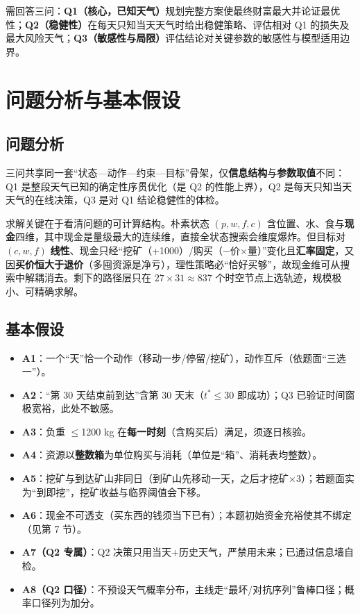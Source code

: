 \documentclass[12pt,a4paper]{ctexart}
\begin{document}
需回答三问：\textbf{Q1（核心，已知天气）}规划完整方案使最终财富最大并论证最优性；\textbf{Q2（稳健性）}在每天只知当天天气时给出稳健策略、评估相对 Q1 的损失及最大风险天气；\textbf{Q3（敏感性与局限）}评估结论对关键参数的敏感性与模型适用边界。

\section{问题分析与基本假设}

\subsection{问题分析}

三问共享同一套“状态—动作—约束—目标”骨架，仅\textbf{信息结构}与\textbf{参数取值}不同：Q1 是整段天气已知的确定性序贯优化（是 Q2 的性能上界），Q2 是每天只知当天天气的在线决策，Q3 是对 Q1 结论稳健性的体检。

求解关键在于看清问题的可计算结构。朴素状态 $(p,w,f,c)$ 含位置、水、食与\textbf{现金}四维，其中现金是量级最大的连续维，直接全状态搜索会维度爆炸。但目标对 $(c,w,f)$ \textbf{线性}、现金只经“挖矿（+1000）/购买（$-$价$\times$量）”变化且\textbf{汇率固定}，又因\textbf{买价恒大于退价}（多囤资源是净亏），理性策略必“恰好买够”，故现金维可从搜索中解耦消去。剩下的路径层只在 $27\times31\approx 837$ 个时空节点上选轨迹，规模极小、可精确求解。

\subsection{基本假设}

\begin{itemize}
  \item \textbf{A1}：一个“天”恰一个动作（移动一步/停留/挖矿），动作互斥（依题面“三选一”）。
  \item \textbf{A2}：“第 30 天结束前到达”含第 30 天末（$t^*\le 30$ 即成功）；Q3 已验证时间窗极宽裕，此处不敏感。
  \item \textbf{A3}：负重 $\le$1200 kg 在\textbf{每一时刻}（含购买后）满足，须逐日核验。
  \item \textbf{A4}：资源以\textbf{整数箱}为单位购买与消耗（单位是“箱”、消耗表均整数）。
  \item \textbf{A5}：挖矿与到达矿山非同日（到矿山先移动一天，之后才挖矿$\times$3）；若题面实为“到即挖”，挖矿收益与临界阈值会下移。
  \item \textbf{A6}：现金不可透支（买东西的钱须当下已有）；本题初始资金充裕使其不绑定（见第 7 节）。
  \item \textbf{A7（Q2 专属）}：Q2 决策只用当天+历史天气，严禁用未来；已通过信息墙自检。
  \item \textbf{A8（Q2 口径）}：不预设天气概率分布，主线走“最坏/对抗序列”鲁棒口径；概率口径列为加分。
\end{itemize}
\end{document}
